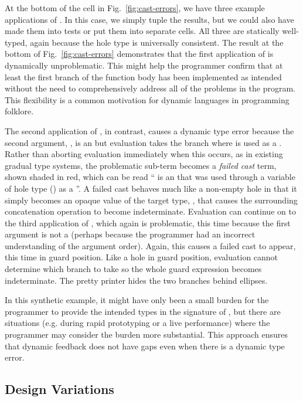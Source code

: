 At the bottom of the cell in Fig.~\ref{fig:cast-errors}, we have three 
example applications of . In this case, we simply tuple the results, but we could also
have made them into tests or put them into separate cells. All three are statically
well-typed, again because the hole type is universally consistent.
The result at the bottom of Fig.~\ref{fig:cast-errors} demonstrates that the first application
of  is dynamically unproblematic. This might help the programmer confirm that at least
the first branch of the function body has been implemented as intended without the need to comprehensively
address all of the problems in the program. This flexibility is a common motivation for dynamic languages in programming folklore.

The second application of , in contrast, causes a dynamic type error because the second argument, , is an  but evaluation takes the branch where  is used as a . 
Rather than aborting evaluation immediately when this occurs, as in existing gradual type systems, the problematic sub-term becomes a \emph{failed cast} term, shown shaded in red, which can be read `` is an  that was used through a variable of hole type () as a ''. 
A failed cast behaves much like a non-empty hole in that it simply becomes an opaque value of the target type, , that causes the surrounding concatenation operation to become indeterminate. 
Evaluation can continue on to the third application of , which again is problematic, this time because the first argument is not a  (perhaps because the programmer had an incorrect understanding of the argument order). 
Again, this causes a failed cast to appear, this time in guard position. Like a hole in guard position, evaluation cannot determine which branch to take so the whole guard expression becomes indeterminate. 
The pretty printer
hides the two branches behind ellipses.

In this synthetic example, it might have only been a small burden for the programmer to provide the intended types in the signature of , but there are situations (e.g. during rapid prototyping or a live performance) where the programmer may consider the burden more substantial. This approach ensures that dynamic feedback does not have gaps even when there is a dynamic type error.

\subsection{Design Variations}


